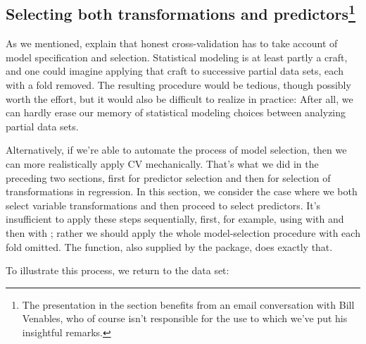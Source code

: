 \documentclass[
]{jss}
\begin{document}
\hypertarget{selecting-both-transformations-and-predictorsvenables}{%
\subsection[Selecting both transformations and
predictors]{\texorpdfstring{Selecting both transformations and
predictors\footnote{The presentation in the section benefits from an
  email conversation with Bill Venables, who of course isn't responsible
  for the use to which we've put his insightful remarks.}}{Selecting both transformations and predictors}}\label{selecting-both-transformations-and-predictorsvenables}}

As we mentioned, \citet[Sec. 7.10.2: ``The Wrong and Right Way to Do
Cross-validation'']{HastieTibshiraniFriedman:2009} explain that honest
cross-validation has to take account of model specification and
selection. Statistical modeling is at least partly a craft, and one
could imagine applying that craft to successive partial data sets, each
with a fold removed. The resulting procedure would be tedious, though
possibly worth the effort, but it would also be difficult to realize in
practice: After all, we can hardly erase our memory of statistical
modeling choices between analyzing partial data sets.

Alternatively, if we're able to automate the process of model selection,
then we can more realistically apply CV mechanically. That's what we did
in the preceding two sections, first for predictor selection and then
for selection of transformations in regression. In this section, we
consider the case where we both select variable transformations and then
proceed to select predictors. It's insufficient to apply these steps
sequentially, first, for example, using  with
 and then with ; rather we
should apply the whole model-selection procedure with each fold omitted.
The  function, also supplied by the
 package, does exactly that.

To illustrate this process, we return to the  data set:
\end{document}
